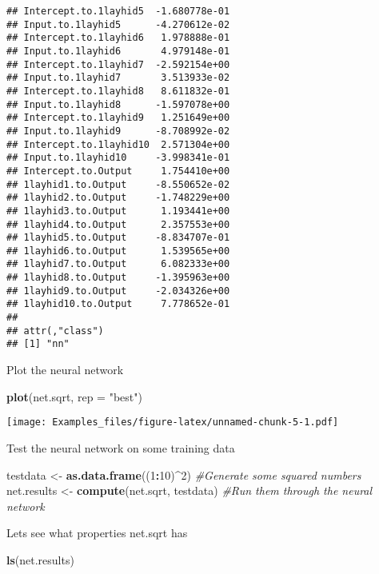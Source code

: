 \documentclass[]{article}
\newenvironment{Shaded}{\begin{snugshade}}{\end{snugshade}}
\newcommand{\CommentTok}[1]{\textcolor[rgb]{0.56,0.35,0.01}{\textit{#1}}}
\newcommand{\DataTypeTok}[1]{\textcolor[rgb]{0.13,0.29,0.53}{#1}}
\newcommand{\DecValTok}[1]{\textcolor[rgb]{0.00,0.00,0.81}{#1}}
\newcommand{\KeywordTok}[1]{\textcolor[rgb]{0.13,0.29,0.53}{\textbf{#1}}}
\newcommand{\NormalTok}[1]{#1}
\newcommand{\OperatorTok}[1]{\textcolor[rgb]{0.81,0.36,0.00}{\textbf{#1}}}
\newcommand{\StringTok}[1]{\textcolor[rgb]{0.31,0.60,0.02}{#1}}
\begin{document}
\begin{verbatim}
## Intercept.to.1layhid5  -1.680778e-01
## Input.to.1layhid5      -4.270612e-02
## Intercept.to.1layhid6   1.978888e-01
## Input.to.1layhid6       4.979148e-01
## Intercept.to.1layhid7  -2.592154e+00
## Input.to.1layhid7       3.513933e-02
## Intercept.to.1layhid8   8.611832e-01
## Input.to.1layhid8      -1.597078e+00
## Intercept.to.1layhid9   1.251649e+00
## Input.to.1layhid9      -8.708992e-02
## Intercept.to.1layhid10  2.571304e+00
## Input.to.1layhid10     -3.998341e-01
## Intercept.to.Output     1.754410e+00
## 1layhid1.to.Output     -8.550652e-02
## 1layhid2.to.Output     -1.748229e+00
## 1layhid3.to.Output      1.193441e+00
## 1layhid4.to.Output      2.357553e+00
## 1layhid5.to.Output     -8.834707e-01
## 1layhid6.to.Output      1.539565e+00
## 1layhid7.to.Output      6.082333e+00
## 1layhid8.to.Output     -1.395963e+00
## 1layhid9.to.Output     -2.034326e+00
## 1layhid10.to.Output     7.778652e-01
## 
## attr(,"class")
## [1] "nn"
\end{verbatim}

Plot the neural network

\begin{Shaded}
\begin{Highlighting}[]
\KeywordTok{plot}\NormalTok{(net.sqrt, }\DataTypeTok{rep =} \StringTok{"best"}\NormalTok{)}
\end{Highlighting}
\end{Shaded}

\texttt{[image: Examples\_files/figure-latex/unnamed-chunk-5-1.pdf]}

Test the neural network on some training data

\begin{Shaded}
\begin{Highlighting}[]
\NormalTok{testdata <-}\StringTok{ }\KeywordTok{as.data.frame}\NormalTok{((}\DecValTok{1}\OperatorTok{:}\DecValTok{10}\NormalTok{)}\OperatorTok{^}\DecValTok{2}\NormalTok{) }\CommentTok{#Generate some squared numbers}
\NormalTok{net.results <-}\StringTok{ }\KeywordTok{compute}\NormalTok{(net.sqrt, testdata) }\CommentTok{#Run them through the neural network}
\end{Highlighting}
\end{Shaded}

Lets see what properties net.sqrt has

\begin{Shaded}
\begin{Highlighting}[]
\KeywordTok{ls}\NormalTok{(net.results)}
\end{Highlighting}
\end{Shaded}
\end{document}

